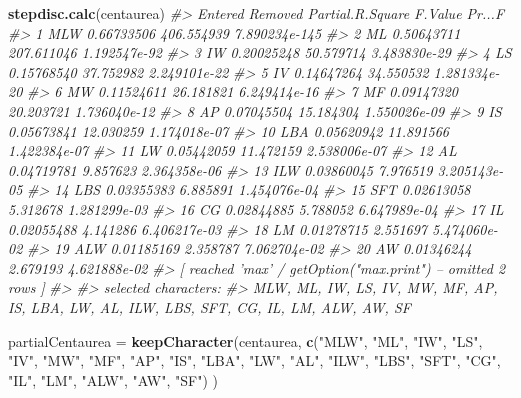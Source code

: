 \documentclass[
]{article}
\newenvironment{Shaded}{\begin{snugshade}}{\end{snugshade}}
\newcommand{\CommentTok}[1]{\textcolor[rgb]{0.56,0.35,0.01}{\textit{#1}}}
\newcommand{\KeywordTok}[1]{\textcolor[rgb]{0.13,0.29,0.53}{\textbf{#1}}}
\newcommand{\NormalTok}[1]{#1}
\newcommand{\StringTok}[1]{\textcolor[rgb]{0.31,0.60,0.02}{#1}}
\begin{document}
\begin{Shaded}
\begin{Highlighting}[]

\KeywordTok{stepdisc.calc}\NormalTok{(centaurea)}
\CommentTok{#>    Entered Removed Partial.R.Square    F.Value        Pr...F}
\CommentTok{#> 1      MLW               0.66733506 406.554939 7.890234e-145}
\CommentTok{#> 2       ML               0.50643711 207.611046  1.192547e-92}
\CommentTok{#> 3       IW               0.20025248  50.579714  3.483830e-29}
\CommentTok{#> 4       LS               0.15768540  37.752982  2.249101e-22}
\CommentTok{#> 5       IV               0.14647264  34.550532  1.281334e-20}
\CommentTok{#> 6       MW               0.11524611  26.181821  6.249414e-16}
\CommentTok{#> 7       MF               0.09147320  20.203721  1.736040e-12}
\CommentTok{#> 8       AP               0.07045504  15.184304  1.550026e-09}
\CommentTok{#> 9       IS               0.05673841  12.030259  1.174018e-07}
\CommentTok{#> 10     LBA               0.05620942  11.891566  1.422384e-07}
\CommentTok{#> 11      LW               0.05442059  11.472159  2.538006e-07}
\CommentTok{#> 12      AL               0.04719781   9.857623  2.364358e-06}
\CommentTok{#> 13     ILW               0.03860045   7.976519  3.205143e-05}
\CommentTok{#> 14     LBS               0.03355383   6.885891  1.454076e-04}
\CommentTok{#> 15     SFT               0.02613058   5.312678  1.281299e-03}
\CommentTok{#> 16      CG               0.02844885   5.788052  6.647989e-04}
\CommentTok{#> 17      IL               0.02055488   4.141286  6.406217e-03}
\CommentTok{#> 18      LM               0.01278715   2.551697  5.474060e-02}
\CommentTok{#> 19     ALW               0.01185169   2.358787  7.062704e-02}
\CommentTok{#> 20      AW               0.01346244   2.679193  4.621888e-02}
\CommentTok{#>  [ reached 'max' / getOption("max.print") -- omitted 2 rows ]}
\CommentTok{#> }
\CommentTok{#> selected characters:}
\CommentTok{#> MLW, ML, IW, LS, IV, MW, MF, AP, IS, LBA, LW, AL, ILW, LBS, SFT, CG, IL, LM, ALW, AW, SF}

\NormalTok{partialCentaurea =}\StringTok{ }\KeywordTok{keepCharacter}\NormalTok{(centaurea, }\KeywordTok{c}\NormalTok{(}\StringTok{"MLW"}\NormalTok{, }\StringTok{"ML"}\NormalTok{, }\StringTok{"IW"}\NormalTok{, }\StringTok{"LS"}\NormalTok{, }\StringTok{"IV"}\NormalTok{, }\StringTok{"MW"}\NormalTok{, }\StringTok{"MF"}\NormalTok{, }\StringTok{"AP"}\NormalTok{, }\StringTok{"IS"}\NormalTok{, }\StringTok{"LBA"}\NormalTok{, }\StringTok{"LW"}\NormalTok{, }\StringTok{"AL"}\NormalTok{, }\StringTok{"ILW"}\NormalTok{, }\StringTok{"LBS"}\NormalTok{, }\StringTok{"SFT"}\NormalTok{, }\StringTok{"CG"}\NormalTok{, }\StringTok{"IL"}\NormalTok{, }\StringTok{"LM"}\NormalTok{, }\StringTok{"ALW"}\NormalTok{, }\StringTok{"AW"}\NormalTok{, }\StringTok{"SF"}\NormalTok{) )}


\end{Highlighting}
\end{Shaded}
\end{document}
